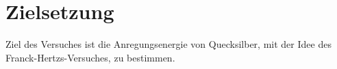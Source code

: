 \section{Zielsetzung}
\label{sec:Ziel}
Ziel des Versuches ist die Anregungsenergie von Quecksilber, mit der
Idee des Franck-Hertzs-Versuches, zu bestimmen.

